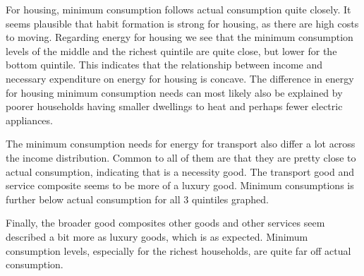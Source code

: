 For housing, minimum consumption follows actual consumption quite closely. It seems plausible that habit formation is strong for housing, as there are high costs to moving. Regarding energy for housing we see that the minimum consumption levels of the middle and the richest quintile are quite close, but lower for the bottom quintile. This indicates that the relationship between income and necessary expenditure on energy for housing is concave. The difference in energy for housing minimum consumption needs can most likely also be explained by poorer households having smaller dwellings to heat and perhaps fewer electric appliances.

The minimum consumption needs for energy for transport also differ a lot across the income distribution. Common to all of them are that they are pretty close to actual consumption, indicating that is a necessity good. The transport good and service composite seems to be more of a luxury good. Minimum consumptions is further below actual consumption for all 3 quintiles graphed. 

Finally, the broader good composites other goods and other services seem described a bit more as luxury goods, which is as expected. Minimum consumption levels, especially for the richest households, are quite far off actual consumption. 

